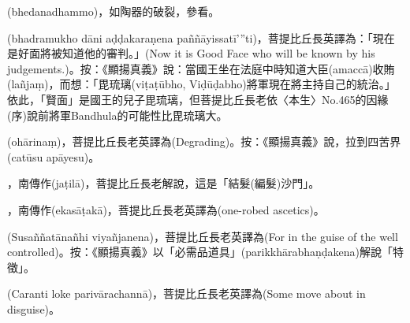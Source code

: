 \startitemgroup[noteitems]
\item{}(bhedanadhammo)，如陶器的破裂，參看。
\stopitemgroup

\startitemgroup[noteitems]
\item{}(bhadramukho dāni aḍḍakaraṇena paññāyissatī’”ti)，菩提比丘長英譯為：「現在是好面將被知道他的審判。」(Now it is Good Face who will be known by his judgements.)。按：《顯揚真義》說：當國王坐在法庭中時知道大臣(amaccā)收賄(lañjaṃ)，而想：「毘琉璃(viṭaṭūbho, Viḍūḍabho)將軍現在將主持自己的統治。」依此，「賢面」是國王的兒子毘琉璃，但菩提比丘長老依〈本生〉No.465的因緣(序)說前將軍Bandhula的可能性比毘琉璃大。
\stopitemgroup

\startitemgroup[noteitems]
\item{}(ohārinaṃ)，菩提比丘長老英譯為(Degrading)。按：《顯揚真義》說，拉到四苦界(catūsu apāyesu)。
\stopitemgroup

\startitemgroup[noteitems]
\item{}，南傳作(jaṭilā)，菩提比丘長老解說，這是「結髮(編髮)沙門」。
\stopitemgroup

\startitemgroup[noteitems]
\item{}，南傳作(ekasāṭakā)，菩提比丘長老英譯為(one-robed ascetics)。
\stopitemgroup

\startitemgroup[noteitems]
\item{}(Susaññatānañhi viyañjanena)，菩提比丘長老英譯為(For in the guise of the well controlled)。按：《顯揚真義》以「必需品道具」(parikkhārabhaṇḍakena)解說「特徵」。
\stopitemgroup

\startitemgroup[noteitems]
\item{}(Caranti loke parivārachannā)，菩提比丘長老英譯為(Some move about in disguise)。
\stopitemgroup


